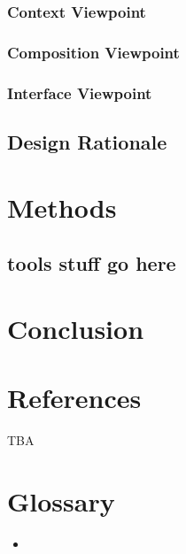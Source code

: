 \documentclass[onecolumn, draftclsnofoot,10pt, compsoc]{IEEEtran}
\begin{document}
\subsubsection{Context Viewpoint}
\subsubsection{Composition Viewpoint}
\subsubsection{Interface Viewpoint}
\subsection{Design Rationale}

\section{Methods}
\subsection{tools stuff go here}




\section{Conclusion}

\section{References}
TBA

\section{Glossary}
\begin{itemize}
    \item 
\end{itemize}
\end{document}
